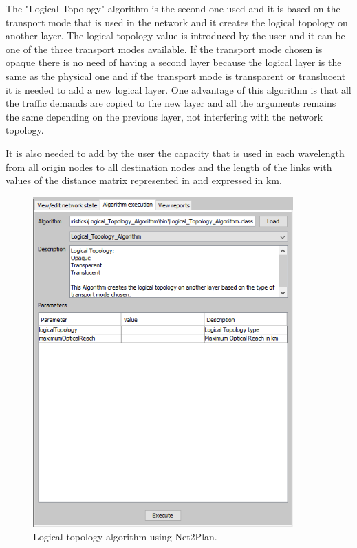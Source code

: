 \vspace{11pt}
The "Logical Topology" algorithm is the second one used and it is based on the transport mode that is used in the network and it creates the logical topology on another layer. The logical topology value is introduced by the user and it can be one of the three transport modes available. If the transport mode chosen is opaque there is no need of having a second layer because the logical layer is the same as the physical one and if the transport mode is transparent or translucent it is needed to add a new logical layer. One advantage of this algorithm is that all the traffic demands are copied to the new layer and all the arguments remains the same depending on the previous layer, not interfering with the network topology.

It is also needed to add by the user the capacity that is used in each wavelength from all origin nodes to all destination nodes and the length of the links with values of the distance matrix represented in \label{Reference_Network_Topology} and expressed in km.

\begin{figure}[h!]
\centering
\includegraphics[width=10cm]{sdf/heuristic/figures/logical_topology}
\caption{Logical topology algorithm using Net2Plan.}
\label{logical_topology}
\end{figure}

